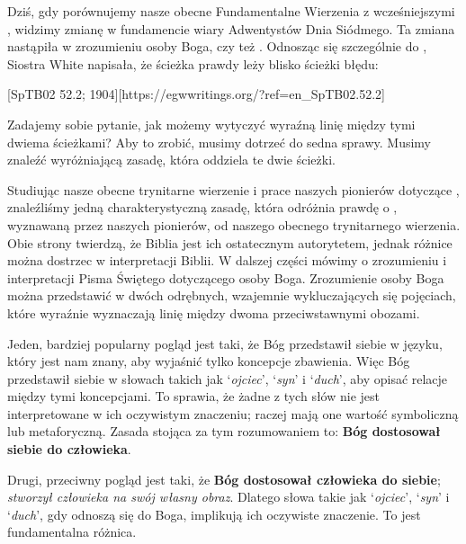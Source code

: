 
Dziś, gdy porównujemy nasze obecne Fundamentalne Wierzenia z wcześniejszymi , widzimy zmianę w fundamencie wiary Adwentystów Dnia Siódmego. Ta zmiana nastąpiła w zrozumieniu osoby Boga, czy też . Odnosząc się szczególnie do , Siostra White napisała, że ścieżka prawdy leży blisko ścieżki błędu:

[SpTB02 52.2; 1904][https://egwwritings.org/?ref=en\_SpTB02.52.2]

Zadajemy sobie pytanie, jak możemy wytyczyć wyraźną linię między tymi dwiema ścieżkami? Aby to zrobić, musimy dotrzeć do sedna sprawy. Musimy znaleźć wyróżniającą zasadę, która oddziela te dwie ścieżki.

Studiując nasze obecne trynitarne wierzenie i prace naszych pionierów dotyczące , znaleźliśmy jedną charakterystyczną zasadę, która odróżnia prawdę o , wyznawaną przez naszych pionierów, od naszego obecnego trynitarnego wierzenia. Obie strony twierdzą, że Biblia jest ich ostatecznym autorytetem, jednak różnice można dostrzec w interpretacji Biblii. W dalszej części mówimy o zrozumieniu i interpretacji Pisma Świętego dotyczącego osoby Boga. Zrozumienie osoby Boga można przedstawić w dwóch odrębnych, wzajemnie wykluczających się pojęciach, które wyraźnie wyznaczają linię między dwoma przeciwstawnymi obozami.

Jeden, bardziej popularny pogląd jest taki, że Bóg przedstawił siebie w języku, który jest nam znany, aby wyjaśnić tylko koncepcje zbawienia. Więc Bóg przedstawił siebie w słowach takich jak ‘\textit{ojciec}’, ‘\textit{syn}’ i ‘\textit{duch}’, aby opisać relacje między tymi koncepcjami. To sprawia, że żadne z tych słów nie jest interpretowane w ich oczywistym znaczeniu; raczej mają one wartość symboliczną lub metaforyczną. Zasada stojąca za tym rozumowaniem to: \textbf{Bóg dostosował siebie do człowieka}.

Drugi, przeciwny pogląd jest taki, że \textbf{Bóg dostosował człowieka do siebie}; \textit{stworzył człowieka na swój własny obraz}. Dlatego słowa takie jak ‘\textit{ojciec}’, ‘\textit{syn}’ i ‘\textit{duch}’, gdy odnoszą się do Boga, implikują ich oczywiste znaczenie. To jest fundamentalna różnica.


